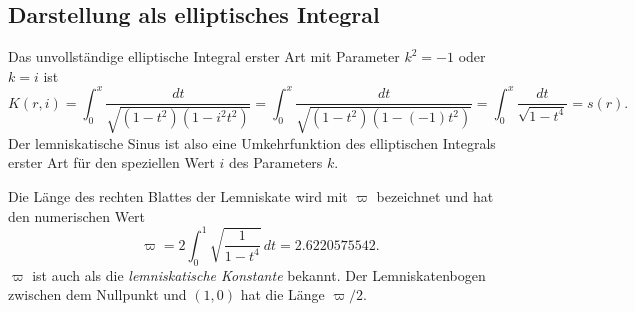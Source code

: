 %
%
\subsection{Darstellung als elliptisches Integral}
Das unvollständige elliptische Integral erster Art mit Parameter
$k^2=-1$ oder $k=i$ ist
\[
K(r,i)
=
\int_0^x \frac{dt}{\sqrt{(1-t^2)(1-i^2 t^2)}}
=
\int_0^x \frac{dt}{\sqrt{(1-t^2)(1-(-1)t^2)}}
=
\int_0^x \frac{dt}{\sqrt{1-t^4}}
=
s(r).
\]
Der lemniskatische Sinus ist also eine Umkehrfunktion des
elliptischen Integrals erster Art für den speziellen Wert $i$ des
Parameters $k$.

Die Länge des rechten Blattes der Lemniskate wird mit $\varpi$ bezeichnet
und hat den numerischen Wert
\begin{equation}
\varpi
=
2\int_0^1\sqrt{\frac{1}{1-t^4}}\,dt
=
2.6220575542.
\label{buch:elliptisch:eqn:varpi}
\end{equation}
$\varpi$ ist auch als die {\em lemniskatische Konstante} bekannt.
%
Der Lemniskatenbogen zwischen dem Nullpunkt und $(1,0)$ hat die Länge
$\varpi/2$.

%
%
